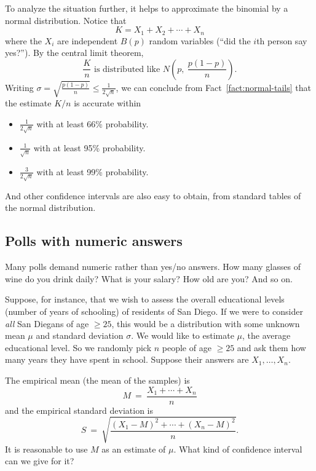 To analyze the situation further, it helps to approximate the binomial by a normal
distribution. Notice that 
$$ K = X_1 + X_2 + \cdots + X_n $$
where the $X_i$ are independent $B(p)$ random variables (``did the $i$th person 
say yes?''). By the central limit theorem,
$$ \frac{K}{n} \mbox{\ is distributed like\ } N\left( p, \ \frac{p(1-p)}{n} \right) .$$
Writing $\sigma = \sqrt{\frac{p(1-p)}{n}} \leq \frac{1}{2\sqrt{n}}$, we can conclude from 
Fact~\ref{fact:normal-tails} that the estimate $K/n$ is accurate within
\begin{itemize}
\item $\frac{1}{2\sqrt{n}}$ with at least 66\% probability.
\item $\frac{1}{\sqrt{n}}$ with at least 95\% probability.
\item $\frac{3}{2\sqrt{n}}$ with at least 99\% probability.
\end{itemize}
And other confidence intervals are also easy to obtain, from standard tables of 
the normal distribution.
 
\subsection{Polls with numeric answers}

Many polls demand numeric rather than yes/no answers. How many glasses of wine do
you drink daily? What is your salary? How old are you? And so on.

Suppose, for instance, that we wish to assess the overall educational levels
(number of years of schooling) of residents of San Diego. If we were to consider 
{\it all} San Diegans of age $\geq 25$, this would be a distribution with some 
unknown mean $\mu$ and standard deviation $\sigma$. We would like to estimate 
$\mu$, the average educational level. So we randomly pick $n$ people of age 
$\geq 25$ and ask them how many years they have spent in school. Suppose their 
answers are $X_1, \ldots, X_n$.

The empirical mean (the mean of the samples) is
$$ M \ = \ \frac{X_1 + \cdots + X_n}{n} $$
and the empirical standard deviation is
$$ S \ = \ \sqrt{\frac{(X_1 - M)^2 + \cdots + (X_n - M)^2}{n}} .$$
It is reasonable to use $M$ as an estimate of $\mu$. What kind of confidence
interval can we give for it?

